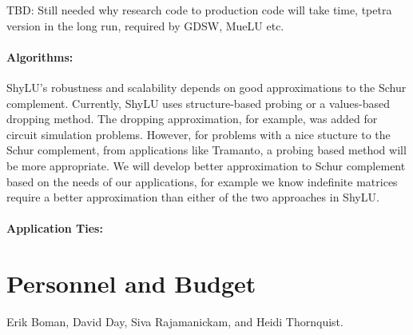 \documentclass[10pt]{amsart}
\begin{document}
TBD: Still needed why research code to production code will take time, tpetra
version in the long run, required by GDSW, MueLU etc.

\paragraph{\bf{Algorithms}:} ShyLU's robustness and scalability depends on good
approximations to the Schur complement. Currently, ShyLU uses 
structure-based probing
or a values-based dropping method. The dropping approximation, for
example, was added for circuit simulation problems. However, for problems
with a nice stucture to the Schur complement, from applications like Tramanto,
a probing based method will be more appropriate. We will develop better
approximation to Schur complement based on the needs of our applications, for
example we know indefinite matrices require a better approximation than either
of the two approaches in ShyLU.

\paragraph{\bf{Application Ties}:}


\section{Personnel and Budget}
Erik Boman, David Day, Siva Rajamanickam, and Heidi Thornquist.
\end{document}
